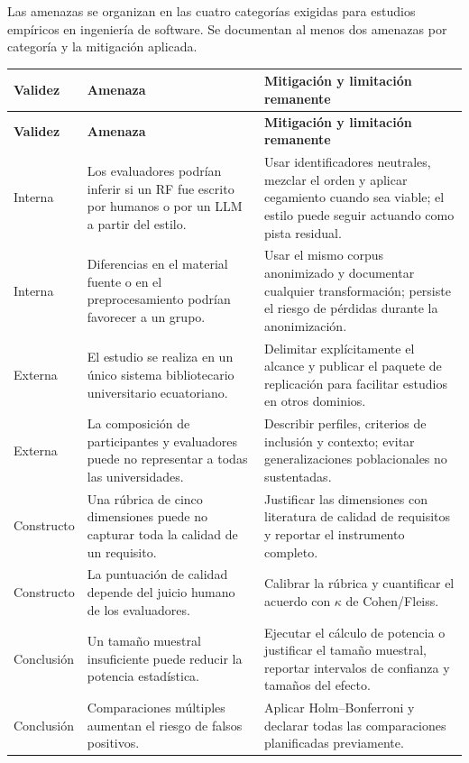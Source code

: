 \documentclass[12pt,journal,onecolumn]{IEEEtran}
\begin{document}
Las amenazas se organizan en las cuatro categorías exigidas para estudios
empíricos en ingeniería de software. Se documentan al menos dos amenazas por
categoría y la mitigación aplicada.

\begin{longtable}{P{0.16\textwidth}P{0.33\textwidth}P{0.41\textwidth}}
\toprule
\textbf{Validez} & \textbf{Amenaza} & \textbf{Mitigación y limitación remanente} \\
\midrule
\endfirsthead
\toprule
\textbf{Validez} & \textbf{Amenaza} & \textbf{Mitigación y limitación remanente} \\
\midrule
\endhead
Interna & Los evaluadores podrían inferir si un RF fue escrito por humanos o por un LLM a partir del estilo. & Usar identificadores neutrales, mezclar el orden y aplicar cegamiento cuando sea viable; el estilo puede seguir actuando como pista residual. \\
Interna & Diferencias en el material fuente o en el preprocesamiento podrían favorecer a un grupo. & Usar el mismo corpus anonimizado y documentar cualquier transformación; persiste el riesgo de pérdidas durante la anonimización. \\
Externa & El estudio se realiza en un único sistema bibliotecario universitario ecuatoriano. & Delimitar explícitamente el alcance y publicar el paquete de replicación para facilitar estudios en otros dominios. \\
Externa & La composición de participantes y evaluadores puede no representar a todas las universidades. & Describir perfiles, criterios de inclusión y contexto; evitar generalizaciones poblacionales no sustentadas. \\
Constructo & Una rúbrica de cinco dimensiones puede no capturar toda la calidad de un requisito. & Justificar las dimensiones con literatura de calidad de requisitos y reportar el instrumento completo. \\
Constructo & La puntuación de calidad depende del juicio humano de los evaluadores. & Calibrar la rúbrica y cuantificar el acuerdo con $\kappa$ de Cohen/Fleiss. \\
Conclusión & Un tamaño muestral insuficiente puede reducir la potencia estadística. & Ejecutar el cálculo de potencia o justificar el tamaño muestral, reportar intervalos de confianza y tamaños del efecto. \\
Conclusión & Comparaciones múltiples aumentan el riesgo de falsos positivos. & Aplicar Holm--Bonferroni y declarar todas las comparaciones planificadas previamente. \\
\bottomrule
\end{longtable}
\end{document}
